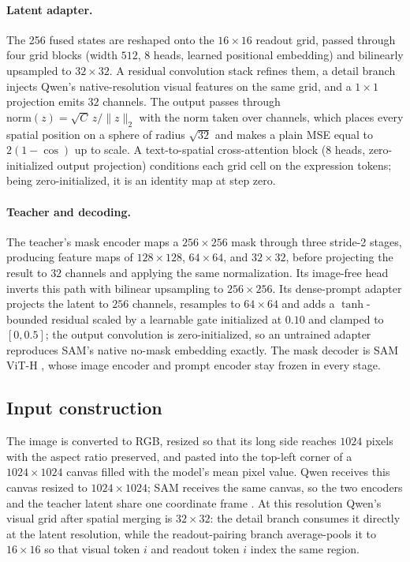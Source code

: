 \paragraph{Latent adapter.}
The 256 fused states are reshaped onto the $16\times16$ readout grid, passed through four grid blocks (width $512$, $8$ heads, learned positional embedding) and bilinearly upsampled to $32\times32$. A residual convolution stack refines them, a detail branch injects Qwen's native-resolution visual features on the same grid, and a $1\times1$ projection emits $32$ channels. The output passes through $\mathrm{norm}(z)=\sqrt{C}\,z/\lVert z\rVert_2$ with the norm taken over channels, which places every spatial position on a sphere of radius $\sqrt{32}$ and makes a plain MSE equal to $2(1-\cos)$ up to scale. A text-to-spatial cross-attention block ($8$ heads, zero-initialized output projection) conditions each grid cell on the expression tokens; being zero-initialized, it is an identity map at step zero.

\paragraph{Teacher and decoding.}
The teacher's mask encoder maps a $256\times256$ mask through three stride-2 stages, producing feature maps of $128\times128$, $64\times64$, and $32\times32$, before projecting the result to $32$ channels and applying the same normalization. Its image-free head inverts this path with bilinear upsampling to $256\times256$. Its dense-prompt adapter projects the latent to $256$ channels, resamples to $64\times64$ and adds a $\tanh$-bounded residual scaled by a learnable gate initialized at $0.10$ and clamped to $[0,0.5]$; the output convolution is zero-initialized, so an untrained adapter reproduces SAM's native no-mask embedding exactly. The mask decoder is SAM ViT-H \cite{Kirillov2023SAM}, whose image encoder and prompt encoder stay frozen in every stage.

\subsection{Input construction}
\label{sec:app_input}

The image is converted to RGB, resized so that its long side reaches $1024$ pixels with the aspect ratio preserved, and pasted into the top-left corner of a $1024\times1024$ canvas filled with the model's mean pixel value. Qwen receives this canvas resized to $1024\times1024$; SAM receives the same canvas, so the two encoders and the teacher latent share one coordinate frame \cite{Bai2025Qwen3VL,Kirillov2023SAM}. At this resolution Qwen's visual grid after spatial merging is $32\times32$: the detail branch consumes it directly at the latent resolution, while the readout-pairing branch average-pools it to $16\times16$ so that visual token $i$ and readout token $i$ index the same region.

